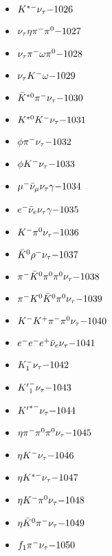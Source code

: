 \begin{multicols}{3}
\begin{itemize}
 \item $ K^{*-} \nu_{\tau} \hfill{-1026}$
 \item $ \nu_{\tau} \eta \pi^{-} \pi^{0} \hfill{-1027}$
 \item $ \nu_{\tau} \pi^{-} \omega \pi^{0} \hfill{-1028}$
 \item $ \nu_{\tau} K^{-} \omega \hfill{-1029}$
 \item $ \bar{K}^{*0} \pi^{-} \nu_{\tau} \hfill{-1030}$
 \item $ K^{*0} K^{-} \nu_{\tau} \hfill{-1031}$
 \item $ \phi \pi^{-} \nu_{\tau} \hfill{-1032}$
 \item $ \phi K^{-} \nu_{\tau} \hfill{-1033}$
 \item $ \mu^{-} \bar{\nu}_{\mu} \nu_{\tau} \gamma \hfill{-1034}$
 \item $ e^{-} \bar{\nu}_{e} \nu_{\tau} \gamma \hfill{-1035}$
 \item $ K^{-} \pi^{0} \nu_{\tau} \hfill{-1036}$
 \item $ \bar{K}^{0} \rho^{-} \nu_{\tau} \hfill{-1037}$
 \item $ \pi^{-} \bar{K}^{0} \pi^{0} \pi^{0} \nu_{\tau} \hfill{-1038}$
 \item $ \pi^{-} K^{0} \bar{K}^{0} \pi^{0} \nu_{\tau} \hfill{-1039}$
 \item $ K^{-} K^{+} \pi^{-} \pi^{0} \nu_{\tau} \hfill{-1040}$
 \item $ e^{-} e^{-} e^{+} \bar{\nu}_{e} \nu_{\tau} \hfill{-1041}$
 \item $ K_{1}^{-} \nu_{\tau} \hfill{-1042}$
 \item $ {K^{\prime}}_{1}^{-} \nu_{\tau} \hfill{-1043}$
 \item $ {K^{\prime}}^{*-} \nu_{\tau} \hfill{-1044}$
 \item $ \eta \pi^{-} \pi^{0} \pi^{0} \nu_{\tau} \hfill{-1045}$
 \item $ \eta K^{-} \nu_{\tau} \hfill{-1046}$
 \item $ \eta K^{*-} \nu_{\tau} \hfill{-1047}$
 \item $ \eta K^{-} \pi^{0} \nu_{\tau} \hfill{-1048}$
 \item $ \eta \bar{K}^{0} \pi^{-} \nu_{\tau} \hfill{-1049}$
 \item $ f_{1} \pi^{-} \nu_{\tau} \hfill{-1050}$
 \end{itemize} 
 \end{multicols} 
